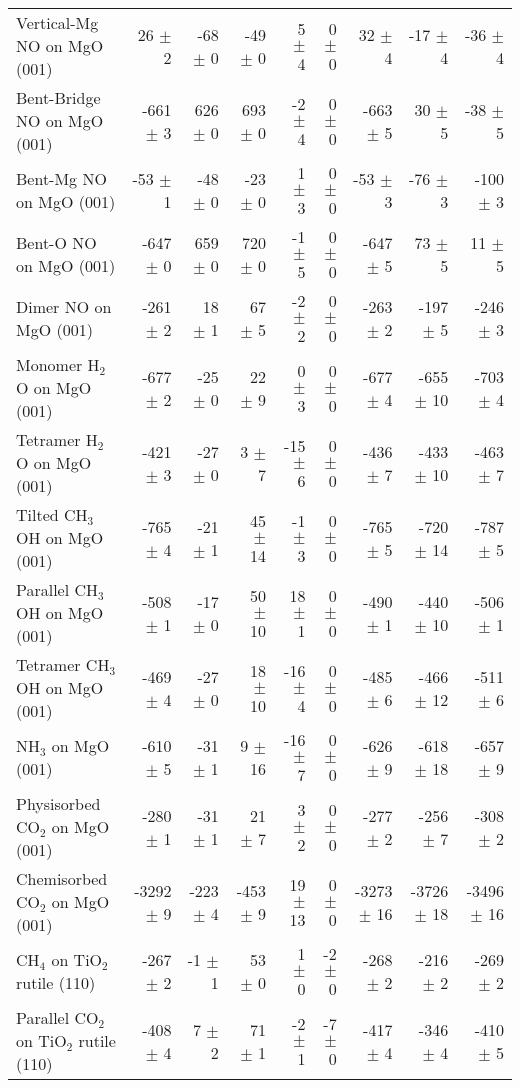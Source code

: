 \begin{table}
\begin{adjustbox}{center,max width=0.9\textwidth}
\begin{tabular}{lrrrrrrrr}
Vertical-Mg NO on MgO (001) & 26 $\pm$ 2 & -68 $\pm$ 0 & -49 $\pm$ 0 & 5 $\pm$ 4 & 0 $\pm$ 0 & 32 $\pm$ 4 & -17 $\pm$ 4 & -36 $\pm$ 4 \\
Bent-Bridge NO on MgO (001) & -661 $\pm$ 3 & 626 $\pm$ 0 & 693 $\pm$ 0 & -2 $\pm$ 4 & 0 $\pm$ 0 & -663 $\pm$ 5 & 30 $\pm$ 5 & -38 $\pm$ 5 \\
Bent-Mg NO on MgO (001) & -53 $\pm$ 1 & -48 $\pm$ 0 & -23 $\pm$ 0 & 1 $\pm$ 3 & 0 $\pm$ 0 & -53 $\pm$ 3 & -76 $\pm$ 3 & -100 $\pm$ 3 \\
Bent-O NO on MgO (001) & -647 $\pm$ 0 & 659 $\pm$ 0 & 720 $\pm$ 0 & -1 $\pm$ 5 & 0 $\pm$ 0 & -647 $\pm$ 5 & 73 $\pm$ 5 & 11 $\pm$ 5 \\
Dimer NO on MgO (001) & -261 $\pm$ 2 & 18 $\pm$ 1 & 67 $\pm$ 5 & -2 $\pm$ 2 & 0 $\pm$ 0 & -263 $\pm$ 2 & -197 $\pm$ 5 & -246 $\pm$ 3 \\
Monomer H$_2$O on MgO (001) & -677 $\pm$ 2 & -25 $\pm$ 0 & 22 $\pm$ 9 & 0 $\pm$ 3 & 0 $\pm$ 0 & -677 $\pm$ 4 & -655 $\pm$ 10 & -703 $\pm$ 4 \\
Tetramer H$_2$O on MgO (001) & -421 $\pm$ 3 & -27 $\pm$ 0 & 3 $\pm$ 7 & -15 $\pm$ 6 & 0 $\pm$ 0 & -436 $\pm$ 7 & -433 $\pm$ 10 & -463 $\pm$ 7 \\
Tilted CH$_3$OH on MgO (001) & -765 $\pm$ 4 & -21 $\pm$ 1 & 45 $\pm$ 14 & -1 $\pm$ 3 & 0 $\pm$ 0 & -765 $\pm$ 5 & -720 $\pm$ 14 & -787 $\pm$ 5 \\
Parallel CH$_3$OH on MgO (001) & -508 $\pm$ 1 & -17 $\pm$ 0 & 50 $\pm$ 10 & 18 $\pm$ 1 & 0 $\pm$ 0 & -490 $\pm$ 1 & -440 $\pm$ 10 & -506 $\pm$ 1 \\
Tetramer CH$_3$OH on MgO (001) & -469 $\pm$ 4 & -27 $\pm$ 0 & 18 $\pm$ 10 & -16 $\pm$ 4 & 0 $\pm$ 0 & -485 $\pm$ 6 & -466 $\pm$ 12 & -511 $\pm$ 6 \\
NH$_3$ on MgO (001) & -610 $\pm$ 5 & -31 $\pm$ 1 & 9 $\pm$ 16 & -16 $\pm$ 7 & 0 $\pm$ 0 & -626 $\pm$ 9 & -618 $\pm$ 18 & -657 $\pm$ 9 \\
Physisorbed CO$_2$ on MgO (001) & -280 $\pm$ 1 & -31 $\pm$ 1 & 21 $\pm$ 7 & 3 $\pm$ 2 & 0 $\pm$ 0 & -277 $\pm$ 2 & -256 $\pm$ 7 & -308 $\pm$ 2 \\
Chemisorbed CO$_2$ on MgO (001) & -3292 $\pm$ 9 & -223 $\pm$ 4 & -453 $\pm$ 9 & 19 $\pm$ 13 & 0 $\pm$ 0 & -3273 $\pm$ 16 & -3726 $\pm$ 18 & -3496 $\pm$ 16 \\
CH$_4$ on TiO$_2$ rutile (110) & -267 $\pm$ 2 & -1 $\pm$ 1 & 53 $\pm$ 0 & 1 $\pm$ 0 & -2 $\pm$ 0 & -268 $\pm$ 2 & -216 $\pm$ 2 & -269 $\pm$ 2 \\
Parallel CO$_2$ on TiO$_2$ rutile (110) & -408 $\pm$ 4 & 7 $\pm$ 2 & 71 $\pm$ 1 & -2 $\pm$ 1 & -7 $\pm$ 0 & -417 $\pm$ 4 & -346 $\pm$ 4 & -410 $\pm$ 5 \\

\end{tabular}
\end{adjustbox}
\end{table}
